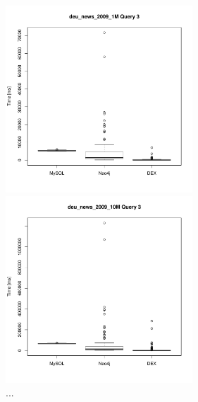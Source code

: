 \documentclass[11pt, a4paper, oneside]{article} %
\begin{document}
\begin{appendix}
\begin{figure}[ht]
\begin{minipage}[hbt]{7cm}
	\centering
	\includegraphics[width=7cm]{../results/cold caches/images/1M_query3_boxplot}
	\caption{...}
	\label{fig:1M_query3_boxplot}
\end{minipage}
\hfill
\begin{minipage}[hbt]{7cm}
	\centering
	\includegraphics[width=7cm]{../results/cold caches/images/10M_query3_boxplot}
	\caption{...}
	\label{fig:10M_query3_boxplot}
\end{minipage}
\end{figure}

\newpage
\thispagestyle{empty}


\end{appendix}
\end{document}
